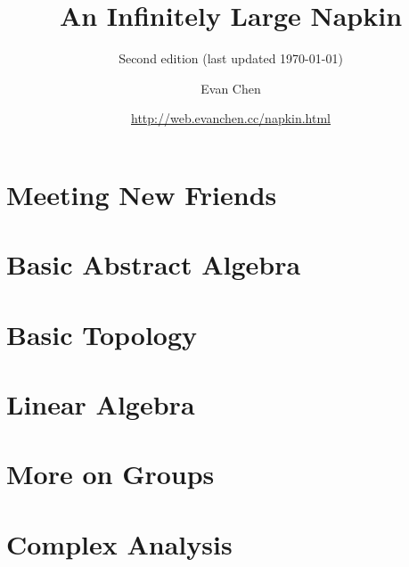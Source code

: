 \documentclass[11pt,twoside=semi,openright,numbers=noenddot]{scrreprt}
\begin{document}
\doparttoc[n]

\title{An Infinitely Large Napkin}
\subtitle{Second edition (last updated \today)}
\author{Evan Chen}
\date{\url{http://web.evanchen.cc/napkin.html}}
\maketitle




\tableofcontents


\part{Meeting New Friends}



\part{Basic Abstract Algebra}




\part{Basic Topology}



\part{Linear Algebra}






\part{More on Groups}




\part{Complex Analysis}



%
\end{document}
